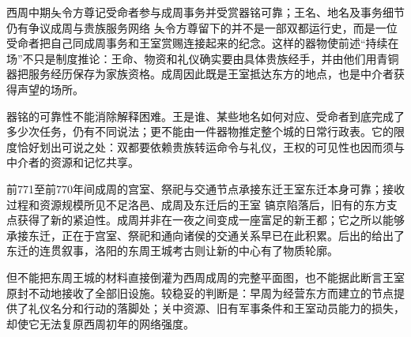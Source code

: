\begin{event}{西周中期}{夨令方尊记受命者参与成周事务并受赏}{器铭可靠；王名、地名及事务细节仍有争议}{成周与贵族服务网络}
夨令方尊留下的并不是一部双都运行史，而是一位受命者把自己同成周事务和王室赏赐连接起来的纪念。这样的器物使前述“持续在场”不只是制度推论：王命、物资和礼仪确实要由具体贵族经手，并由他们用青铜器把服务经历保存为家族资格。成周因此既是王室抵达东方的地点，也是中介者获得声望的场所。

器铭的可靠性不能消除解释困难。王是谁、某些地名如何对应、受命者到底完成了多少次任务，仍有不同说法；更不能由一件器物推定整个城的日常行政表。它的限度恰好划出可说之处：双都要依赖贵族转运命令与礼仪，王权的可见性也因而须与中介者的资源和记忆共享。
\end{event}

\begin{event}{前771至前770年间}{成周的宫室、祭祀与交通节点承接东迁王室}{东迁本身可靠；接收过程和资源规模所见不足}{洛邑、成周及东迁后的王室}
镐京陷落后，旧有的东方支点获得了新的紧迫性。成周并非在一夜之间变成一座富足的新王都；它之所以能够承接东迁，正在于宫室、祭祀和通向诸侯的交通关系早已在此积累。后出的给出了东迁的连贯叙事，洛阳的东周王城考古则让新的中心有了物质轮廓。

但不能把东周王城的材料直接倒灌为西周成周的完整平面图，也不能据此断言王室原封不动地接收了全部旧设施。较稳妥的判断是：早周为经营东方而建立的节点提供了礼仪名分和行动的落脚处；关中资源、旧有军事条件和王室动员能力的损失，却使它无法复原西周初年的网络强度。
\end{event}


